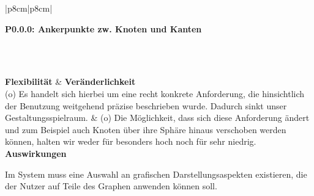 \documentclass[enabledeprecatedfontcommands,fontsize=11pt,paper=a4,twoside]{scrartcl}
\newcounter{one}
\newcounter{two}[one]
\newcounter{three}[two]
\newcommand{\tone}{0\theone}
\newcommand{\ttwo}{0\thetwo}
\newcommand{\three}{\stepcounter{three}0\thethree}
\begin{document}
\begin{tabular} {|p{8cm}|p{8cm}|}
	\hline
	 {\parbox{16cm}{\textbf{\hypertarget{s}{P\tone.\ttwo.\three}: Ankerpunkte zw. Knoten und Kanten}} }\\ \hline\hline
	\rule{0pt}{8ex}\\ [6ex] \hline
	\textbf{Flexibilität}  & \textbf{Veränderlichkeit} \\
	(o) Es handelt sich hierbei um eine recht konkrete Anforderung, die hinsichtlich der Benutzung weitgehend präzise beschrieben wurde. Dadurch sinkt unser Gestaltungsspielraum. &
	(o) Die Möglichkeit, dass sich diese Anforderung ändert und zum Beispiel auch Knoten über ihre Sphäre hinaus verschoben werden können, halten wir weder für besonders hoch noch für sehr niedrig. \\ \hline
	 {\textbf{Auswirkungen}} \\
	 {\parbox{16cm}{Im System muss eine Auswahl an grafischen Darstellungsaspekten existieren, die der Nutzer auf Teile des Graphen anwenden können soll.}}\\ \hline
\end{tabular}
\newpage
\end{document}
